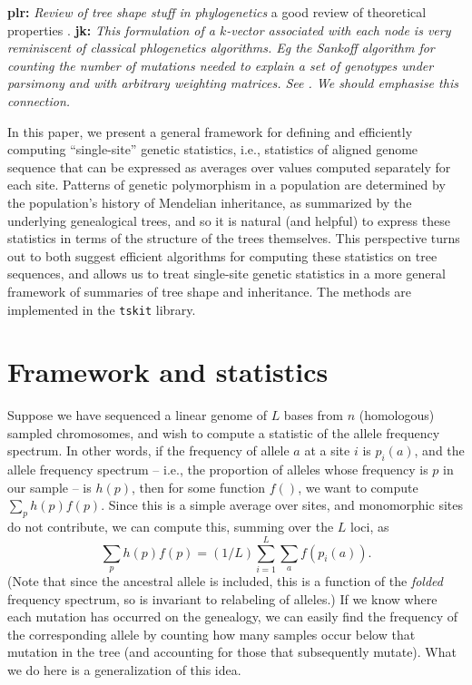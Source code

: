 \documentclass{article}
\newcommand{\tskit}{{\texttt{tskit}}}
\newcommand{\plr}[1]{{\color{blue}\textbf{plr:} \it #1}}
\newcommand{\jk}[1]{{\color{red}\textbf{jk:} \it #1}}
\begin{document}
\plr{Review of tree shape stuff in phylogenetics}
a good review of theoretical properties \citet{semple2003phylogenetics}.
\jk{This formulation of a $k$-vector associated with each node is very
reminiscent of classical phlogenetics algorithms. Eg the Sankoff algorithm
for counting the number of mutations needed to explain a set of genotypes
under parsimony and with arbitrary weighting matrices. See
\citep[pg.13]{felsenstein2004inferring}. We should emphasise this connection.}

In this paper, we present a general framework for defining and efficiently computing
``single-site'' genetic statistics,
i.e., statistics of aligned genome sequence that can be expressed as averages over values computed
separately for each site.
Patterns of genetic polymorphism in a population
are determined by the population's history of Mendelian inheritance,
as summarized by the underlying genealogical trees,
and so it is natural (and helpful) to express these statistics
in terms of the structure of the trees themselves.
This perspective turns out to both suggest efficient algorithms
for computing these statistics on tree sequences,
and allows us to treat single-site genetic statistics in a more general framework
of summaries of tree shape and inheritance.
The methods are implemented in the \tskit{} library.

\section*{Framework and statistics}


Suppose we have sequenced a linear genome of $L$ bases from $n$ (homologous) sampled chromosomes,
and wish to compute a statistic of the allele frequency spectrum.
In other words, if the frequency of allele $a$ at a site $i$ is $p_i(a)$,
and the allele frequency spectrum
-- i.e., the proportion of alleles whose frequency is $p$ in our sample -- is $h(p)$,
then for some function $f()$, we want to compute $\sum_p h(p) f(p)$.
Since this is a simple average over sites, and monomorphic sites do not contribute,
we can compute this, summing over the $L$ loci, as
$$\sum_p h(p) f(p) = (1/L) \sum_{i=1}^L \sum_a f(p_i(a)).$$
(Note that since the ancestral allele is included, this is a function of the
\emph{folded} frequency spectrum, so is invariant to relabeling of alleles.)
If we know where each mutation has occurred on the genealogy,
we can easily find the frequency of the corresponding allele by counting how many samples
occur below that mutation in the tree (and accounting for those that subsequently mutate).
What we do here is a generalization of this idea.
\end{document}
